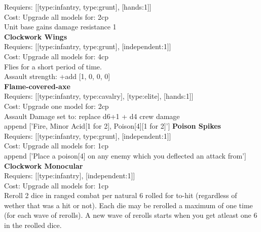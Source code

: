 Requiers: [[type:infantry, type:grunt], [hands:1]] \\
Cost: Upgrade all models for: 2cp \\
Unit base gains damage resistance 1\\ 







{\bf Clockwork Wings } \\

Requiers: [[type:infantry, type:grunt], [independent:1]] \\
Cost: Upgrade all models for: 4cp \\
Flies for a short period of time.\\ 





Assault strength: +add [1, 0, 0, 0] 
\\ 


{\bf Flame-covered-axe } \\

Requiers: [[type:infantry, type:cavalry], [type:elite], [hands:1]] \\
Cost: Upgrade one model for: 2cp \\





Assault Damage set to: replace d6+1 + d4 crew damage
\\ 

append ['Fire, Minor Acid[1 for 2], Poison[4][1 for 2]']
{\bf Poison Spikes } \\

Requiers: [[type:infantry, type:grunt], [independent:1]] \\
Cost: Upgrade all models for: 1cp \\






append ['Place a poison[4] on any enemy which you deflected an attack from']
{\bf Clockwork Monocular } \\

Requiers: [[type:infantry], [independent:1]] \\
Cost: Upgrade all models for: 1cp \\
Reroll 2 dice in ranged combat per natural 6 rolled for to-hit (regardless of wether that was a hit or not). Each die may be rerolled a maximum of one time (for each wave of rerolls). A new wave of rerolls starts when you get atleast one 6 in the reolled dice.\\ 







